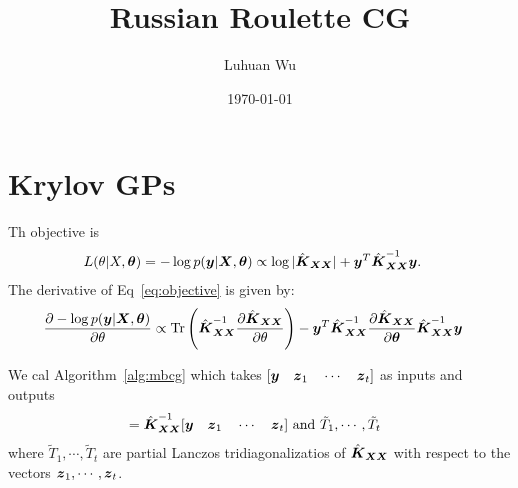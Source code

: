 \documentclass{article}
\title{Russian Roulette CG} %
\author{Luhuan Wu} %
\date{\today} %
\begin{document}
\maketitle %




\section{Krylov GPs}

Th objective is
\begin{align}\label{eq:objective}
 L(\theta | X, {\boldsymbol{\theta}}) &= -\log p(\boldsymbol{y}| \boldsymbol{X}, {\boldsymbol{\theta}}) \propto  \log | \hat{\boldsymbol{K}}_{\boldsymbol{X} \boldsymbol{X}} | + \boldsymbol{y}^T \hat{\boldsymbol{K}}_{\boldsymbol{X}\boldsymbol{X}}^{-1} \boldsymbol{y}.
\end{align}
The derivative of Eq~\ref{eq:objective} is given by:
\begin{align}
  \frac{\partial -\log p(\boldsymbol{y} | \boldsymbol{X}, {\boldsymbol{\theta}})}{\partial \theta} &
   \propto \textrm{Tr}\left( \hat{\boldsymbol{K}}_{\boldsymbol{X} \boldsymbol{X}}^{-1} \frac{\partial \hat{\boldsymbol{K}}_{\boldsymbol{X}\boldsymbol{X}}}{\partial \theta}\right)
   - \boldsymbol{y}^T \hat{\boldsymbol{K}}_{\boldsymbol{X}\boldsymbol{X}}^{-1} \frac{\partial \hat{\boldsymbol{K}}_{\boldsymbol{X}\boldsymbol{X}}}{\partial {\boldsymbol{\theta}}} \hat{\boldsymbol{K}}_{\boldsymbol{X}\boldsymbol{X}}^{-1} \boldsymbol{y}
\end{align}

We cal Algorithm~\ref{alg:mbcg} which takes $[\boldsymbol{y} \quad \boldsymbol{z}_1 \quad \cdots \quad \boldsymbol{z}_t]$ as inputs and outputs
\begin{align}
  [\bu_0 \quad \bu_1 \quad \cdots \quad \bu_t] &= \hat{\bK}_{\bX \bX}^{-1} [\by \quad \bz_1 \quad \cdots \quad \bz_t] \textrm{ and } \tilde{T}_1, \cdots, \tilde{T}_t
\end{align}
where $\tilde{T}_1, \cdots, \tilde{T}_t$ are partial Lanczos tridiagonalizatios of $\hat{\boldsymbol{K}}_{\boldsymbol{X}\boldsymbol{X}}$ with respect to the vectors $\boldsymbol{z}_1, \cdots, \boldsymbol{z}_t$.
\end{document}
